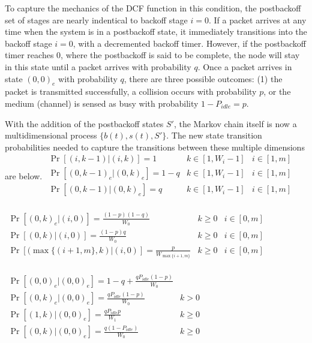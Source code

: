 \documentclass{llncs}
\begin{document}
To capture the mechanics of the DCF function in this condition, the postbackoff set of stages are nearly indentical to backoff stage $i = 0$. If a packet arrives at any time when the system is in a postbackoff state, it immediately transitions into the backoff stage $i = 0$, with a decremented backoff timer. However, if the postbackoff timer reaches $0$, where the postbackoff is said to be complete, the node will stay in this state until a packet arrives with probability $q$. Once a packet arrives in state $(0, 0)_e$ with probability $q$, there are three possible outcomes: (1) the packet is transmitted successfully, a collision occurs with probability $p$, or the medium (channel) is sensed as busy with probability $1 - P_{idle} = p$. 

With the addition of the postbackoff states $S'$, the Markov chain itself is now a multidimensional process $\{b(t), s(t), S' \}$. The new state transition probabilities needed to capture the transitions between these multiple dimensions are below.
\begin{math}
\begin{array}{lll}
\Pr[(i,k-1) | (i, k)] = 1 & k \in [1, W_i-1] & i \in [1,m] \\
\Pr[(0,k-1)_e | (0, k)_e] = 1-q & k \in [1, W_i-1] & i \in [1,m] \\
\Pr[(0,k-1) | (0, k)_e] = q & k \in [1, W_i-1] & i \in [1,m] \\
\end{array}
\end{math}

\begin{math}
\begin{array}{lll}
\Pr[(0,k)_e | (i, 0)] = \frac{(1-p)(1-q)}{W_0} & k \geq 0 & i \in [0,m] \\
\Pr[(0,k) | (i, 0)] = \frac{(1-p)q}{W_0} & k \geq 0 & i \in [0,m] \\
\Pr[(\max\{(i+1,m\}, k) | (i, 0)] = \frac{p}{W_{\max\{i+1,m\}}} & k \geq 0 & i \in [0,m] \\
\end{array}
\end{math}

\begin{math}
\begin{array}{ll}
\Pr[(0,0)_e | (0, 0)_e] = 1 - q + \frac{qP_{idle}(1 - p)}{W_0} & ~ \\
\Pr[(0,k)_e | (0, 0)_e] = \frac{qP_{idle}(1 - p)}{W_0} & k > 0 \\
\Pr[(1,k) | (0, 0)_e] = \frac{qP_{idle}p}{W_1} & k \geq 0 \\
\Pr[(0,k) | (0, 0)_e] = \frac{q(1 - P_{idle})}{W_0} & k \geq 0 \\
\end{array}
\end{math}
\end{document}

